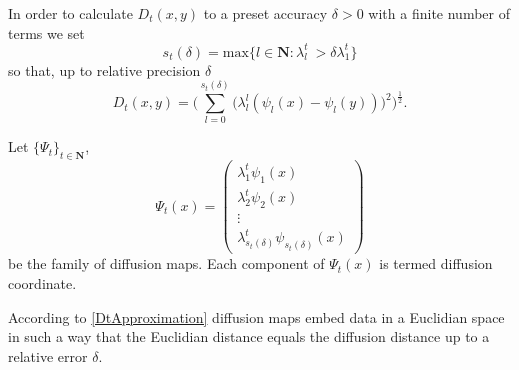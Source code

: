 In order to calculate $D_t(x,y)$ to a preset accuracy $\delta>0$ with a finite number of terms we set
$$s_t(\delta)= \text{max}\{l\in\mathbf{N} : \lambda_l^t \>> \delta\lambda_1^t\}$$
so that, up to relative precision $\delta$
\begin{equation}\label{DtApproximation}
D_t(x,y)=\bigg(\sum_{l=0}^{s_t(\delta)} \Big(\lambda_l^{l}(\psi_l(x) - \psi_l(y))\Big)^2 \bigg)^{\frac{1}{2}}.
\end{equation}

\begin{definition}
Let $\{\Psi_t\}_{t\in\mathbf{N}}$,
$$\Psi_t(x)=\begin{pmatrix}
  \lambda_1^{t}\psi_1(x) \\
  \lambda_2^{t}\psi_2(x) \\
  \vdots \\
  \lambda_{s_t(\delta)}^{t}\psi_{s_t(\delta)}(x)
 \end{pmatrix}$$ be the family of diffusion maps. Each component of $\Psi_t(x)$ is termed diffusion coordinate.
\end{definition}

According to \ref{DtApproximation} diffusion maps embed data in a Euclidian space in such a way that the Euclidian distance equals the diffusion distance up to a relative error $\delta$.

